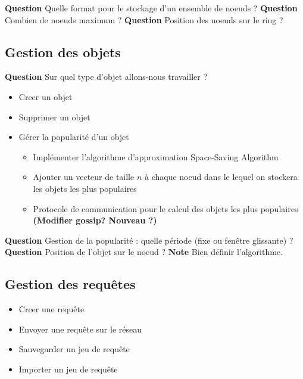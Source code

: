 \documentclass[12pt]{article}
\begin{document}
\vspace{0.5cm}

\textbf{Question } Quelle format pour le stockage d'un ensemble de noeuds ? \newline
\textbf{Question } Combien de noeuds maximum ? \newline
\textbf{Question } Position des noeuds sur le ring ? \newline


\subsection{Gestion des objets}

\textbf{Question } Sur quel type d'objet allons-nous travailler ? \newline

\begin{itemize}
 \item Creer un objet
 \item Supprimer un objet
 \item Gérer la popularité d'un objet
 \begin{itemize}
  \item Implémenter l'algorithme d'approximation Space-Saving Algorithm
  \item Ajouter un vecteur de taille $n$ à chaque noeud dans le lequel on stockera les objets les plus populaires
  \item Protocole de communication pour le calcul des objets les plus populaires \textbf{(Modifier gossip? Nouveau ?)}
 \end{itemize}
\end{itemize}

\vspace{0.5cm}

\textbf{Question } Gestion de la popularité : quelle période (fixe ou fenêtre glissante) ? \newline
\textbf{Question } Position de l'objet sur le noeud ? \newline
\textbf{Note } Bien définir l'algorithme. \newline

\subsection{Gestion des requêtes}

\begin{itemize}
 \item Creer une requête
 \item Envoyer une requête sur le réseau
 \item Sauvegarder un jeu de requête
 \item Importer un jeu de requête
\end{itemize}
\end{document}
